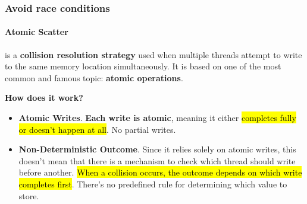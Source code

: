 \subsubsection{Avoid race conditions}

\paragraph{Atomic Scatter}\label{subsubsection: Avoid race conditions}

 is a \textbf{collision resolution strategy} used when multiple threads attempt to write to the same memory location simultaneously. It is based on one of the most common and famous topic: \textbf{atomic operations}.

\highspace
\begin{flushleft}
    \textcolor{Green3}{ \textbf{How does it work?}}
\end{flushleft}
\begin{itemize}
    \item[\textcolor{Green3}{\faIcon{check}}] \textcolor{Green3}{\textbf{Atomic Writes}}. \textbf{Each write is atomic}, meaning it either \hl{completes fully or doesn't happen at all}. No partial writes.

    \item[\textcolor{Red2}{\faIcon{times}}] \textcolor{Red2}{\textbf{Non-Deterministic Outcome}}. Since it relies solely on atomic writes, this doesn't mean that there is a mechanism to check which thread should write before another. \hl{When a collision occurs, the outcome depends on which write completes first}. There's no predefined rule for determining which value to store.
\end{itemize}

